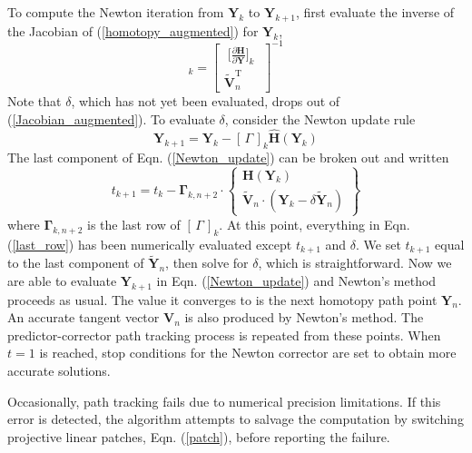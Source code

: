 \documentclass[journal]{IEEEtran}
\begin{document}
To compute the Newton iteration from $\mathbf{Y}_k$ to $\mathbf{Y}_{k+1}$, first evaluate the inverse of the Jacobian of (\ref{homotopy_augmented}) for $\mathbf{Y}_k$,
\begin{equation}
[\,\Gamma\,]_k = 
\begin{bmatrix}
\; \big[ \frac{\partial \mathbf{H}}{\partial \mathbf{Y}} \big]_k \; \\[2mm]
\tilde{\mathbf{V}}_n^\text{T}
\end{bmatrix}^{-1} \label{Jacobian_augmented}
\end{equation}
Note that $\delta$, which has not yet been evaluated, drops out of (\ref{Jacobian_augmented}).
To evaluate $\delta$, consider the Newton update rule
\begin{equation}
\mathbf{Y}_{k+1} = \mathbf{Y}_k - [\,\Gamma\,]_k \hat{\mathbf{H}}(\mathbf{Y}_k)
\label{Newton_update}
\end{equation}
The last component of Eqn. (\ref{Newton_update}) can be broken out and written
\begin{equation}
t_{k+1} = t_k - \mathbf{\Gamma}_{k,n+2} \cdot
\begin{Bmatrix}
\mathbf{H}(\mathbf{Y}_k) \\
\tilde{\mathbf{V}}_n \cdot (\mathbf{Y}_k - \delta \tilde{\mathbf{Y}}_n)
\end{Bmatrix} \label{last_row}
\end{equation}
where $\mathbf{\Gamma}_{k,n+2}$ is the last row of $[\,\Gamma\,]_k$.  At this point, everything in Eqn. (\ref{last_row}) has been numerically evaluated except $t_{k+1}$ and $\delta$.  
We set $t_{k+1}$ equal to the last component of $\tilde{\mathbf{Y}}_n$, then solve for $\delta$, which is straightforward.  
Now we are able to evaluate $\mathbf{Y}_{k+1}$ in Eqn. (\ref{Newton_update}) and Newton's method proceeds as usual.  
The value it converges to is the next homotopy path point $\mathbf{Y}_n$.  
An accurate tangent vector $\mathbf{V}_n$ is also produced by Newton's method.
The predictor-corrector path tracking process is repeated from these points.
When $t=1$ is reached, stop conditions for the Newton corrector are set to obtain more accurate solutions.

Occasionally, path tracking fails due to numerical precision limitations.
If this error is detected, the algorithm attempts to salvage the computation by switching projective linear patches, Eqn. (\ref{patch}), before reporting the failure.
\end{document}
